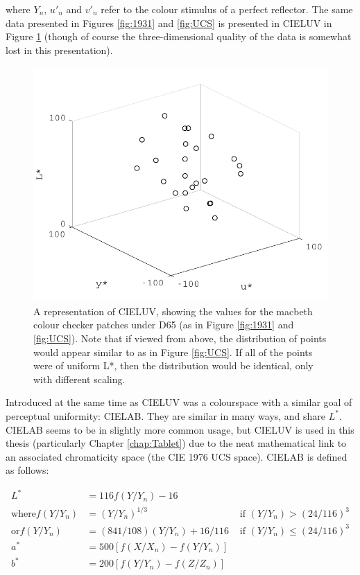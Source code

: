 where $Y_{n}$, $u'_{n}$ and $v'_{n}$ refer to the colour stimulus of a perfect reflector. The same data presented in Figures \ref{fig:1931} and \ref{fig:UCS} is presented in CIELUV in Figure \ref{fig:CIELUV} (though of course the three-dimensional quality of the data is somewhat lost in this presentation). 

\begin{figure}[hbtp]
\includegraphics[max width=\textwidth]{figs/LitRev/ColorimetryDemo4.pdf}
\caption{A representation of CIELUV, showing the values for the macbeth colour checker patches under D65 (as in Figure \ref{fig:1931} and \ref{fig:UCS}). Note that if viewed from above, the distribution of points would appear similar to as in Figure \ref{fig:UCS}. If all of the points were of uniform L*, then the distribution would be identical, only with different scaling.}
\label{fig:CIELUV}
\end{figure}

Introduced at the same time as CIELUV was a colourspace with a similar goal of perceptual uniformity: CIELAB. They are similar in many ways, and share $L^{*}$. CIELAB seems to be in slightly more common usage, but CIELUV is used in this thesis (particularly Chapter \ref{chap:Tablet}) due to the neat mathematical link to an associated chromaticity space (the CIE 1976 UCS space). CIELAB is defined as follows:

\begin{subequations}
\begin{align}
L^{*} &= 116 f(Y/Y_{n})-16 \\
\textrm{where} f(Y/Y_{n}) &= (Y/Y_{n})^{1/3} &\textrm{ if } (Y/Y_{n}) > (24/116)^{3} \\
\textrm{or} f(Y/Y_{n}) &= (841/108)(Y/Y_{n})+16/116 &\textrm{ if } (Y/Y_{n}) \leq (24/116)^{3} \\
a^{*} &= 500[f(X/X_{n}) - f(Y/Y_{n})] \\ 
b^{*} &= 200[f(Y/Y_{n}) - f(Z/Z_{n})] \\
\end{align}
\end{subequations}

